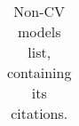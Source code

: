 \begin{table}
{\begin{tabular}{llc}
 		
 		
		\bottomrule
	\end{tabular}
	}
	\caption{Non-\acrlong{CV} models list, containing its citations.}
	\label{tab:non_cv_list}
\end{table}
